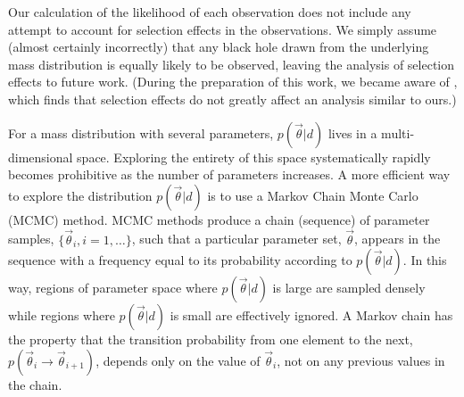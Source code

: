 \documentclass[preprint]{aastex}
\newcommand{\vtheta}{\vec{\theta}}
\begin{document}
Our calculation of the likelihood of each observation does not include
any attempt to account for selection effects in the observations.  We
simply assume (almost certainly incorrectly) that any black hole drawn
from the underlying mass distribution is equally likely to be
observed, leaving the analysis of selection effects to future work.
(During the preparation of this work, we became aware of
\citet{Ozel2010}, which finds that selection effects do not greatly
affect an analysis similar to ours.)

For a mass distribution with several parameters, $p(\vtheta | d)$
lives in a multi-dimensional space.  Exploring the entirety of this
space systematically rapidly becomes prohibitive as the number of
parameters increases.  A more efficient way to explore the
distribution $p(\vtheta | d)$ is to use a Markov Chain Monte Carlo
(MCMC) method.  MCMC methods produce a chain (sequence) of parameter
samples, $\{ \vtheta_i, i = 1, \ldots \}$, such that a particular
parameter set, $\vtheta$, appears in the sequence with a frequency
equal to its probability according to $p(\vtheta|d)$.  In this way,
regions of parameter space where $p(\vtheta|d)$ is large are sampled
densely while regions where $p(\vtheta|d)$ is small are effectively
ignored.  A Markov chain has the property that the transition
probability from one element to the next, $p(\vtheta_i \to
\vtheta_{i+1})$, depends only on the value of $\vtheta_i$, not on any
previous values in the chain.
\end{document}
